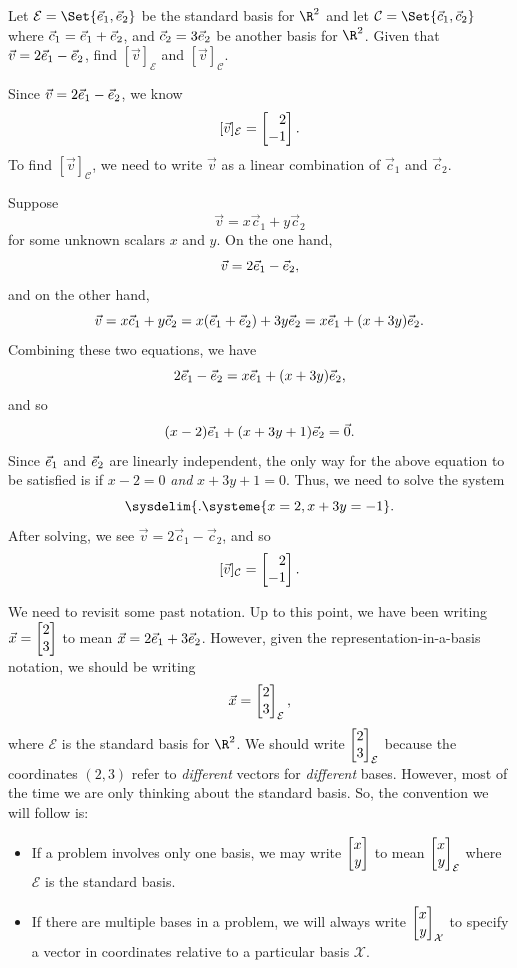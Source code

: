 
\begin{example}
	Let $\mathcal E=\Set{\xhat,\yhat}$ be the standard basis for $\R^2$ and let $\mathcal C=\Set{\vec c_1,\vec c_2}$
	where $\vec c_1={\vec e_1}+{\vec e_2}$, and $\vec c_2 =3{\vec e_2}$ be another basis for $\R^2$. Given that $\vec v=2{\vec e_1}-{\vec e_2}$, 
	find $[\vec v]_{\mathcal E}$ and $[\vec v]_{\mathcal C}$.

	Since $\vec v=2{\vec e_1}-{\vec e_2}$, we know
	\[
	    [\vec v]_{\mathcal E}=\mat{2\\-1}.
	\]
	To find $[\vec v]_{\mathcal C}$, we need to write $\vec v$ as a linear combination of $\vec c_1$ and $\vec c_2$. 
	
	Suppose
	\[
		\vec v = x\vec c_1 + y\vec c_2    
	\]
	for some unknown scalars $x$ and $y$. On the one hand,
	\[
	    \vec v = 2{\vec e_1}-{\vec e_2},
	\]
	and on the other hand, 
	\[
	    \vec v  = x\vec c_1 + y\vec c_2= x({\vec e_1}+{\vec e_2})+3y{\vec e_2}=x{\vec e_1}+(x+3y){\vec e_2}.
	\]
	Combining these two equations, we have
	\[
	    2{\vec e_1}-{\vec e_2} = x{\vec e_1}+(x+3y){\vec e_2},
	\]
	and so
	\[
		(x-2){\vec e_1}+(x+3y+1){\vec e_2} = \vec 0. 
	\]
	Since ${\vec e_1}$ and ${\vec e_2}$ are linearly independent, the only way for the above equation to be satisfied is if
	$x-2=0$ \emph{and} $x+3y+1=0$. Thus, we need to solve the system
	\[
	    \sysdelim\{.
		\systeme{
			x=2,
			x+3y=-1
		}.
	\]
	After solving, we see $\vec v=2\vec c_1 - \vec c_2$, and so
	\[
	   [\vec v]_{\mathcal C}=\mat{2\\-1}. 
	\]
\end{example}

We need to revisit some past notation. Up to this point, we have been writing $\vec x=\mat{2\\3}$ to mean
$\vec x=2{\vec e_1}+3{\vec e_2}$. However, given the representation-in-a-basis notation, we should be writing
\[
	\vec x=\mat{2\\3}_{\mathcal E},
\]
where $\mathcal E$ is the standard basis for $\R^2$. We should write $\mat{2\\3}_{\mathcal E}$ because the coordinates $(2,3)$
refer to \emph{different} vectors for \emph{different} bases. However, most of the time we are only thinking about the standard
basis. So, the convention we will follow is:
\begin{itemize}
	\item If a problem involves only one basis, we may write $\mat{x\\y}$ to mean $\mat{x\\y}_{\mathcal E}$ where
	$\mathcal E$ is the standard basis.
	\item If there are multiple bases in a problem, we will always write $\mat{x\\y}_{\mathcal X}$ to specify a vector in
	coordinates relative to a particular basis $\mathcal X$.
\end{itemize}


